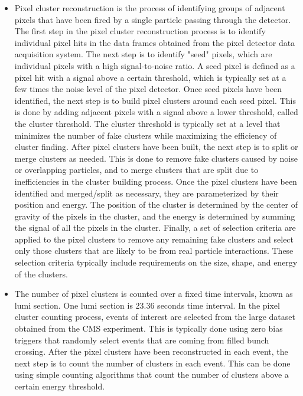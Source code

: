 \begin{itemize}
\item Pixel cluster reconstruction is the process of identifying groups of adjacent pixels that have been fired by a single particle passing through the detector. The first step in the pixel cluster reconstruction process is to identify individual pixel hits in the data frames obtained from the pixel detector data acquisition system. %
The next step is to identify "seed" pixels, which are individual pixels with a high signal-to-noise ratio. A seed pixel is defined as a pixel hit with a signal above a certain threshold, which is typically set at a few times the noise level of the pixel detector. Once seed pixels have been identified, the next step is to build pixel clusters around each seed pixel. This is done by adding adjacent pixels with a signal above a lower threshold, called the cluster threshold. The cluster threshold is typically set at a level that minimizes the number of fake clusters while maximizing the efficiency of cluster finding. After pixel clusters have been built, the next step is to split or merge clusters as needed. This is done to remove fake clusters caused by noise or overlapping particles, and to merge clusters that are split due to inefficiencies in the cluster building process. Once the pixel clusters have been identified and merged/split as necessary, they are parameterized by their position and energy. The position of the cluster is determined by the center of gravity of the pixels in the cluster, and the energy is determined by summing the signal of all the pixels in the cluster. Finally, a set of selection criteria are applied to the pixel clusters to remove any remaining fake clusters and select only those clusters that are likely to be from real particle interactions. These selection criteria typically include requirements on the size, shape, and energy of the clusters.

\item The number of pixel clusters is counted over a fixed time intervals, known as lumi section. One lumi section is 23.36 seconds time interval. In the pixel cluster counting process, events of interest are selected from the large dataset obtained from the CMS experiment. This is typically done using zero bias triggers that randomly select events that are coming from filled bunch crossing.
  After the pixel clusters have been reconstructed in each event, the next step is to count the number of clusters in each event. This can be done using simple counting algorithms that count the number of clusters above a certain energy threshold. %


\end{itemize}
